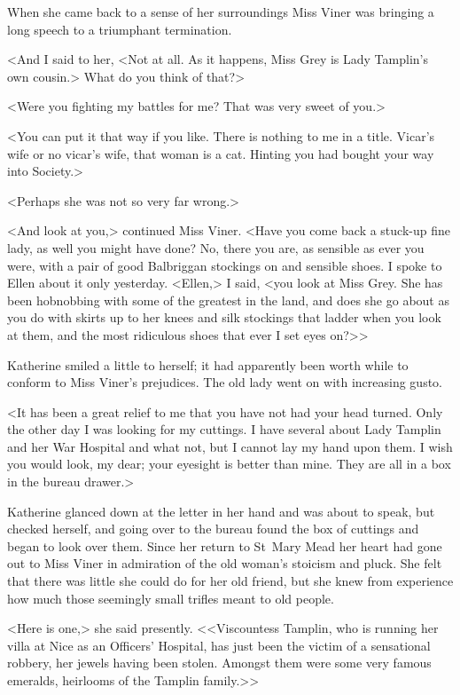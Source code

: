 When she came back to a sense of her surroundings Miss Viner was bringing a long speech to a triumphant termination.

<And I said to her, <Not at all. As it happens, Miss Grey is Lady Tamplin's own cousin.> What do you think of that?>

<Were you fighting my battles for me? That was very sweet of you.>

<You can put it that way if you like. There is nothing to me in a title. Vicar's wife or no vicar's wife, that woman is a cat. Hinting you had bought your way into Society.>

<Perhaps she was not so very far wrong.>

<And look at you,> continued Miss Viner. <Have you come back a stuck-up fine lady, as well you might have done? No, there you are, as sensible as ever you were, with a pair of good Balbriggan stockings on and sensible shoes. I spoke to Ellen about it only yesterday. <Ellen,> I said, <you look at Miss Grey. She has been hobnobbing with some of the greatest in the land, and does she go about as you do with skirts up to her knees and silk stockings that ladder when you look at them, and the most ridiculous shoes that ever I set eyes on?>>

Katherine smiled a little to herself; it had apparently been worth while to conform to Miss Viner's prejudices. The old lady went on with increasing gusto.

<It has been a great relief to me that you have not had your head turned. Only the other day I was looking for my cuttings. I have several about Lady Tamplin and her War Hospital and what not, but I cannot lay my hand upon them. I wish you would look, my dear; your eyesight is better than mine. They are all in a box in the bureau drawer.>

Katherine glanced down at the letter in her hand and was about to speak, but checked herself, and going over to the bureau found the box of cuttings and began to look over them. Since her return to St~Mary Mead her heart had gone out to Miss Viner in admiration of the old woman's stoicism and pluck. She felt that there was little she could do for her old friend, but she knew from experience how much those seemingly small trifles meant to old people.

<Here is one,> she said presently. <<Viscountess Tamplin, who is running her villa at Nice as an Officers' Hospital, has just been the victim of a sensational robbery, her jewels having been stolen. Amongst them were some very famous emeralds, heirlooms of the Tamplin family.>>

